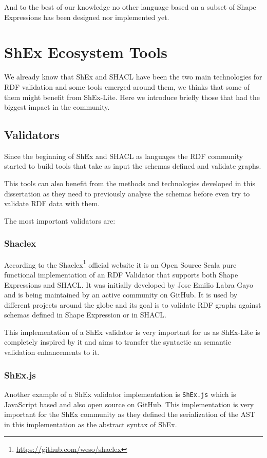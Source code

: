 \bigskip

And to the best of our knowledge no other language based on a subset of Shape Expressions has been designed nor implemented yet.


\section{ShEx Ecosystem Tools}
\label{sec:related-work-shex-ecosystem}

We already know that ShEx and SHACL have been the two main technologies for RDF validation and some tools
emerged around them, we thinks that some of them might benefit from ShEx-Lite. Here we introduce briefly
those that had the biggest impact in the community.

\subsection{Validators}
Since the beginning of ShEx and SHACL as languages the RDF community started to build tools that take as
input the schemas defined and validate graphs.

This tools can also benefit from the methods and technologies developed in this dissertation as they need
to previously analyse the schemas before even try to validate RDF data with them.

The most important validators are:

\subsubsection{Shaclex}
According to the Shaclex\footnote{\url{https://github.com/weso/shaclex}} official website it is an Open
Source Scala pure functional implementation of an RDF Validator that supports both Shape Expressions and
SHACL. It was initially developed by Jose Emilio Labra Gayo and is being maintained by an active
community on GitHub. It is used by different projects around the globe and its goal is to validate RDF
graphs against schemas defined in Shape Expression or in SHACL.

This implementation of a ShEx validator is very important for us as ShEx-Lite is completely inspired by it
and aims to transfer the syntactic an semantic validation enhancements to it.

\subsubsection{ShEx.js}
Another example of a ShEx validator implementation is \texttt{ShEx.js} which is JavaScript based and also
open source on GitHub. This implementation is very important for the ShEx community as they defined the
serialization of the AST in this implementation as the abstract syntax of ShEx.


